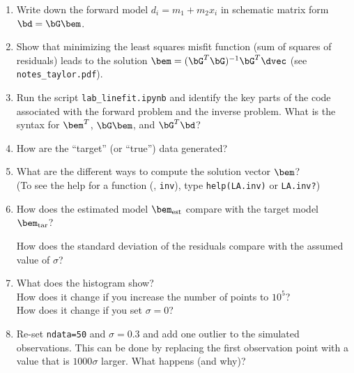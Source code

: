 \documentclass[11pt,titlepage,fleqn]{article}
\begin{document}
\begin{enumerate}
\item Write down the forward model $d_i = m_1 + m_2 x_i$ in schematic matrix form $\bd = \bG\bem$.

\vertgap
\vertgap

\item Show that minimizing the least squares misfit function (\ie sum of squares of residuals) leads to the solution $\bem = (\bG^T\bG)^{-1}\bG^T\dvec$ (see \verb+notes_taylor.pdf+).

\vertgap
\vertgap
\vertgap

\item Run the script \verb+lab_linefit.ipynb+ and identify the key parts of the code associated with the forward problem and the inverse problem. What is the syntax for $\bem^T$, $\bG\bem$, and $\bG^T\bd$?

\vertgap

\item How are the ``target'' (or ``true'') data generated?

\vertgap

\item What are the different ways to compute the solution vector $\bem$? \\
(To see the help for a function (\eg, \verb+inv+), type \verb+help(LA.inv)+ or \verb+LA.inv?+)

\vertgap

\item How does the estimated model $\bem_{\rm est}$ compare with the target model $\bem_{\rm tar}$?

\vertgap

How does the standard deviation of the residuals compare with the assumed value of $\sigma$?

\vertgap

\item What does the histogram show? \\
How does it change if you increase the number of points to $10^5$? \\
How does it change if you set $\sigma = 0$?

\vertgap

\item Re-set \verb+ndata=50+ and $\sigma = 0.3$ and add one outlier to the simulated observations. This can be done by replacing the first observation point with a value that is $1000\sigma$ larger. What happens (and why)?

\vertgap


\end{enumerate}
\end{document}

